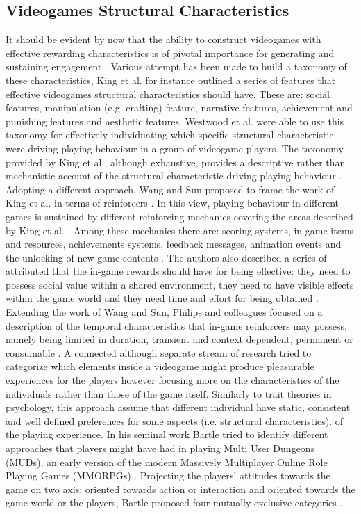 \subsection{Videogames Structural Characteristics}
\label{factors_engagement}
It should be evident by now that the ability to construct videogames with effective rewarding characteristics is of pivotal importance for generating and sustaining engagement \cite{king2010role, king2010video, yannakakis2013player}. Various attempt has been made to build a taxonomy of these characteristics, King et al. \cite{king2010video} for instance outlined a series of features that effective videogames structural characteristics should have. These are: social features, manipulation (e.g. crafting) feature, narrative features, achievement and punishing features and aesthetic features. Westwood et al. \cite{westwood2010role} were able to use this taxonomy for effectively individuating which specific structural characteristic were driving playing behaviour in a group of videogame players. The taxonomy provided by King et al., although exhaustive, provides a descriptive rather than mechanistic account of the structural characteristic driving playing behaviour \cite{king2010role}. Adopting a different approach, Wang and Sun proposed to frame the work of King et al. in terms of reinforcers \cite{king2010video, wang2011game}. In this view, playing behaviour in different games is sustained by different reinforcing mechanics covering the areas described by King et al. \cite{king2010video, wang2011game}. Among these mechanics there are: scoring systems, in-game items and resources, achievements systems, feedback messages, animation events and the unlocking of new game contents \cite{wang2011game}. The authors also described a series of attributed that the in-game rewards should have for being effective: they need to possess social value within a shared environment, they need to have visible effects within the game world and they need time and effort for being obtained \cite{wang2011game}. Extending the work of Wang and Sun, Philips and colleagues focused on a description of the temporal characteristics that in-game reinforcers may possess, namely being limited in duration, transient and context dependent, permanent or consumable \cite{phillips2013videogame}. A connected although separate stream of research tried to categorize which elements inside a videogame might produce pleasurable experiences for the players however focusing more on the characteristics of the individuals rather than those of the game itself. Similarly to trait theories in psychology, this approach assume that different individual have static, consistent and well defined preferences for some aspects (i.e. structural characteristics). of the playing experience. In his seminal work Bartle tried to identify different approaches that players might have had in playing Multi User Dungeons (MUDs), an early version of the modern Massively Multiplayer Online Role Playing Games (MMORPGs) \cite{bartle1996hearts}. Projecting the players’ attitudes towards the game on two axis: oriented towards action or interaction and oriented towards the game world or the players, Bartle proposed four mutually exclusive categories \cite{bartle1996hearts}. 
